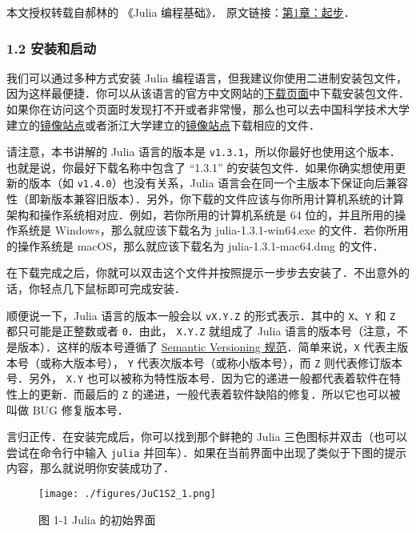 
本文授权转载自郝林的 《Julia 编程基础》． 原文链接：\href{https://github.com/hyper0x/JuliaBasics/blob/master/book/ch01.md}{第1章：起步}．

\subsubsection{1.2 安装和启动}

我们可以通过多种方式安装 Julia 编程语言，但我建议你使用二进制安装包文件，因为这样最便捷．你可以从该语言的官方中文网站的\href{https://cn.julialang.org/downloads/}{下载页面}中下载安装包文件．如果你在访问这个页面时发现打不开或者非常慢，那么也可以去中国科学技术大学建立的\href{https://mirrors.zju.edu.cn/julia/releases/}{镜像站点}或者浙江大学建立的\href{https://mirrors.ustc.edu.cn/julia/releases/}{镜像站点}下载相应的文件．

请注意，本书讲解的 Julia 语言的版本是 \verb|v1.3.1|，所以你最好也使用这个版本．也就是说，你最好下载名称中包含了 “1.3.1” 的安装包文件．如果你确实想使用更新的版本（如 \verb|v1.4.0|）也没有关系，Julia 语言会在同一个主版本下保证向后兼容性（即新版本兼容旧版本）．另外，你下载的文件应该与你所用计算机系统的计算架构和操作系统相对应．例如，若你所用的计算机系统是 64 位的，并且所用的操作系统是 Windows，那么就应该下载名为 julia-1.3.1-win64.exe 的文件．若你所用的操作系统是 macOS，那么就应该下载名为 julia-1.3.1-mac64.dmg 的文件．

在下载完成之后，你就可以双击这个文件并按照提示一步步去安装了．不出意外的话，你轻点几下鼠标即可完成安装．

顺便说一下，Julia 语言的版本一般会以 \verb|vX.Y.Z| 的形式表示．其中的 \verb|X|、\verb|Y| 和 \verb|Z| 都只可能是正整数或者 \verb|0|．由此， \verb|X.Y.Z| 就组成了 Julia 语言的版本号（注意，不是版本）．这样的版本号遵循了 \href{https://semver.org}{Semantic Versioning 规范}．简单来说，\verb|X| 代表主版本号（或称大版本号）， \verb|Y| 代表次版本号（或称小版本号），而 \verb|Z| 则代表修订版本号．另外， \verb|X.Y| 也可以被称为特性版本号．因为它的递进一般都代表着软件在特性上的更新．而最后的 \verb|Z| 的递进，一般代表着软件缺陷的修复．所以它也可以被叫做 BUG 修复版本号．

言归正传．在安装完成后，你可以找到那个鲜艳的 Julia 三色图标并双击（也可以尝试在命令行中输入 \verb|julia| 并回车）．如果在当前界面中出现了类似于下图的提示内容，那么就说明你安装成功了．

\begin{figure}[ht]
\centering
\texttt{[image: ./figures/JuC1S2\_1.png]}
\caption{图 1-1 Julia 的初始界面} \label{JuC1S2_fig1}
\end{figure}

